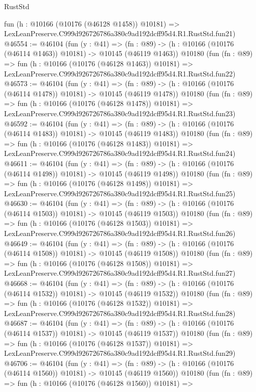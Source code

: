 \begin{lexlean}{RustStd}
\begin{coremodule}
    fun (h : @10166 (@10176 (@46128 @1458)) @10181) =>
    LexLeanPreserve.C999d926726786a380c9ad192dcff95d4.R1.RustStd.fun21)
@46554 := @46104
    (fun (y : @41) =>
    (fn : @89) -> (h : @10166 (@10176 (@46114 @1463)) @10181) -> @10145 (@46119 @1463))
    @10180
    (fun (fn : @89) =>
    fun (h : @10166 (@10176 (@46128 @1463)) @10181) =>
    LexLeanPreserve.C999d926726786a380c9ad192dcff95d4.R1.RustStd.fun22)
@46573 := @46104
    (fun (y : @41) =>
    (fn : @89) -> (h : @10166 (@10176 (@46114 @1478)) @10181) -> @10145 (@46119 @1478))
    @10180
    (fun (fn : @89) =>
    fun (h : @10166 (@10176 (@46128 @1478)) @10181) =>
    LexLeanPreserve.C999d926726786a380c9ad192dcff95d4.R1.RustStd.fun23)
@46592 := @46104
    (fun (y : @41) =>
    (fn : @89) -> (h : @10166 (@10176 (@46114 @1483)) @10181) -> @10145 (@46119 @1483))
    @10180
    (fun (fn : @89) =>
    fun (h : @10166 (@10176 (@46128 @1483)) @10181) =>
    LexLeanPreserve.C999d926726786a380c9ad192dcff95d4.R1.RustStd.fun24)
@46611 := @46104
    (fun (y : @41) =>
    (fn : @89) -> (h : @10166 (@10176 (@46114 @1498)) @10181) -> @10145 (@46119 @1498))
    @10180
    (fun (fn : @89) =>
    fun (h : @10166 (@10176 (@46128 @1498)) @10181) =>
    LexLeanPreserve.C999d926726786a380c9ad192dcff95d4.R1.RustStd.fun25)
@46630 := @46104
    (fun (y : @41) =>
    (fn : @89) -> (h : @10166 (@10176 (@46114 @1503)) @10181) -> @10145 (@46119 @1503))
    @10180
    (fun (fn : @89) =>
    fun (h : @10166 (@10176 (@46128 @1503)) @10181) =>
    LexLeanPreserve.C999d926726786a380c9ad192dcff95d4.R1.RustStd.fun26)
@46649 := @46104
    (fun (y : @41) =>
    (fn : @89) -> (h : @10166 (@10176 (@46114 @1508)) @10181) -> @10145 (@46119 @1508))
    @10180
    (fun (fn : @89) =>
    fun (h : @10166 (@10176 (@46128 @1508)) @10181) =>
    LexLeanPreserve.C999d926726786a380c9ad192dcff95d4.R1.RustStd.fun27)
@46668 := @46104
    (fun (y : @41) =>
    (fn : @89) -> (h : @10166 (@10176 (@46114 @1532)) @10181) -> @10145 (@46119 @1532))
    @10180
    (fun (fn : @89) =>
    fun (h : @10166 (@10176 (@46128 @1532)) @10181) =>
    LexLeanPreserve.C999d926726786a380c9ad192dcff95d4.R1.RustStd.fun28)
@46687 := @46104
    (fun (y : @41) =>
    (fn : @89) -> (h : @10166 (@10176 (@46114 @1537)) @10181) -> @10145 (@46119 @1537))
    @10180
    (fun (fn : @89) =>
    fun (h : @10166 (@10176 (@46128 @1537)) @10181) =>
    LexLeanPreserve.C999d926726786a380c9ad192dcff95d4.R1.RustStd.fun29)
@46706 := @46104
    (fun (y : @41) =>
    (fn : @89) -> (h : @10166 (@10176 (@46114 @1560)) @10181) -> @10145 (@46119 @1560))
    @10180
    (fun (fn : @89) =>
    fun (h : @10166 (@10176 (@46128 @1560)) @10181) =>

\end{coremodule}
\end{lexlean}
